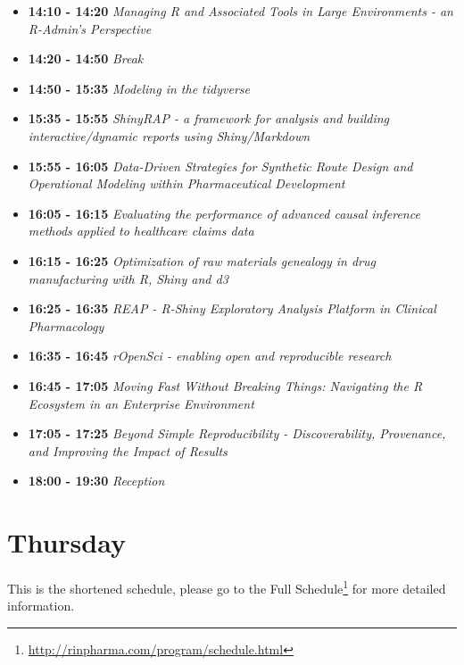 \documentclass[]{book}
\renewcommand{\href}[2]{#2\footnote{\url{#1}}}
\theoremstyle{definition}
\theoremstyle{definition}
\theoremstyle{definition}
\theoremstyle{remark}
\begin{document}
\begin{itemize}
\item
  \textbf{14:10 - 14:20} \emph{Managing R and Associated Tools in Large
  Environments - an R-Admin's Perspective}
\item
  \textbf{14:20 - 14:50} \emph{Break}
\item
  \textbf{14:50 - 15:35} \emph{Modeling in the tidyverse}
\item
  \textbf{15:35 - 15:55} \emph{ShinyRAP - a framework for analysis and
  building interactive/dynamic reports using Shiny/Markdown}
\item
  \textbf{15:55 - 16:05} \emph{Data-Driven Strategies for Synthetic
  Route Design and Operational Modeling within Pharmaceutical
  Development}
\item
  \textbf{16:05 - 16:15} \emph{Evaluating the performance of advanced
  causal inference methods applied to healthcare claims data}
\item
  \textbf{16:15 - 16:25} \emph{Optimization of raw materials genealogy
  in drug manufacturing with R, Shiny and d3}
\item
  \textbf{16:25 - 16:35} \emph{REAP - R-Shiny Exploratory Analysis
  Platform in Clinical Pharmacology}
\item
  \textbf{16:35 - 16:45} \emph{rOpenSci - enabling open and reproducible
  research}
\item
  \textbf{16:45 - 17:05} \emph{Moving Fast Without Breaking Things:
  Navigating the R Ecosystem in an Enterprise Environment}
\item
  \textbf{17:05 - 17:25} \emph{Beyond Simple Reproducibility -
  Discoverability, Provenance, and Improving the Impact of Results}
\item
  \textbf{18:00 - 19:30} \emph{Reception}
\end{itemize}

\hypertarget{thursday}{%
\section{Thursday}\label{thursday}}

This is the shortened schedule, please go to
\href{http://rinpharma.com/program/schedule.html}{the Full Schedule} for
more detailed information.
\end{document}
